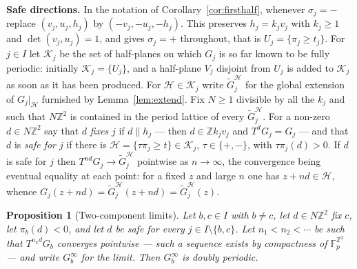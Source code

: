 \documentclass[11pt,reqno]{amsart}
\theoremstyle{plain}
\newtheorem{prop}[thm]{Proposition}
\theoremstyle{definition}
\theoremstyle{remark}
\theoremstyle{plain}
\theoremstyle{remark}
\theoremstyle{definition}
\numberwithin{equation}{section}
\newcommand{\Z}{\mathbb{Z}}
\newcommand{\Fp}{\mathbb{F}_p}
\newcommand{\cH}{\mathcal{H}}
\newcommand{\cK}{\mathcal{K}}
\begin{document}
\smallskip\noindent\textbf{Safe directions.}
In the notation of Corollary~\ref{cor:firsthalf}, whenever $\sigma_j=-$ replace
$(v_j,u_j,h_j)$ by $(-v_j,-u_j,-h_j)$.  This preserves $h_j=k_jv_j$ with
$k_j\ge1$ and $\det(v_j,u_j)=1$, and gives $\sigma_j=+$ throughout, that is
$U_j=\{\pi_j\ge t_j\}$.  For
$j\in I$ let $\cK_j$ be the set of half-planes on which $G_j$ is so far known to
be fully periodic: initially $\cK_j=\{U_j\}$, and a half-plane $V_j$ disjoint
from $U_j$ is added to $\cK_j$ as soon as it has been produced.  For
$\cH\in\cK_j$ write $\widetilde G_j^{\cH}$ for the global extension of
$G_j|_{\cH}$ furnished by Lemma~\ref{lem:extend}.  Fix $N\ge1$ divisible by all
the $k_j$ and such that $N\Z^2$ is contained in the period lattice of every
$\widetilde G_j^{\cH}$.  For a non-zero $d\in N\Z^2$ say that $d$ \emph{fixes}
$j$ if $d\parallel h_j$ — then $d\in\Z k_jv_j$ and $T^dG_j=G_j$ — and that $d$
is \emph{safe for $j$} if there is
$\cH=\{\tau\pi_j\ge t\}\in\cK_j$, $\tau\in\{+,-\}$, with $\tau\pi_j(d)>0$.  If
$d$ is safe for $j$ then $T^{nd}G_j\to\widetilde G_j^{\cH}$ pointwise as
$n\to\infty$, the convergence being eventual equality at each point: for a fixed
$z$ and large $n$ one has $z+nd\in\cH$, whence
$G_j(z+nd)=\widetilde G_j^{\cH}(z+nd)=\widetilde G_j^{\cH}(z)$.

\begin{prop}[Two-component limits]\label{prop:twolimits}
Let $b,c\in I$ with $b\ne c$, let $d\in N\Z^2$ fix $c$, let $\pi_b(d)<0$, and
let $d$ be safe for every $j\in I\setminus\{b,c\}$.  Let
$n_1<n_2<\cdots$ be such that $T^{n_kd}G_b$ converges pointwise — such a
sequence exists by compactness of $\Fp^{\Z^2}$ — and write $G_b^\infty$ for the
limit.  Then $G_b^\infty$ is doubly periodic.
\end{prop}
\end{document}
